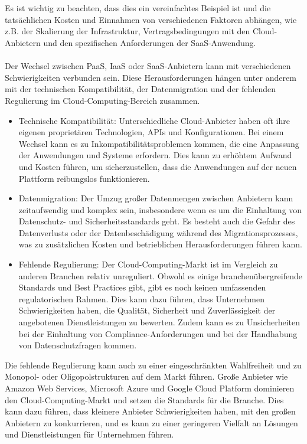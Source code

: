 \documentclass[../vs-script-first-v01.tex]{subfiles}
\begin{document}
\\\\
Es ist wichtig zu beachten, dass dies ein vereinfachtes Beispiel ist und die tatsächlichen Kosten und Einnahmen von verschiedenen Faktoren abhängen, wie z.B. der Skalierung der Infrastruktur, Vertragsbedingungen mit den Cloud-Anbietern und den spezifischen Anforderungen der SaaS-Anwendung.
\\\\
Der Wechsel zwischen PaaS, IaaS oder SaaS-Anbietern kann mit verschiedenen Schwierigkeiten verbunden sein. Diese Herausforderungen hängen unter anderem mit der technischen Kompatibilität, der Datenmigration und der fehlenden Regulierung im Cloud-Computing-Bereich zusammen.
\begin{itemize}
\item Technische Kompatibilität: Unterschiedliche Cloud-Anbieter haben oft ihre eigenen proprietären Technologien, APIs und Konfigurationen. Bei einem Wechsel kann es zu Inkompatibilitätsproblemen kommen, die eine Anpassung der Anwendungen und Systeme erfordern. Dies kann zu erhöhtem Aufwand und Kosten führen, um sicherzustellen, dass die Anwendungen auf der neuen Plattform reibungslos funktionieren.

\item Datenmigration: Der Umzug großer Datenmengen zwischen Anbietern kann zeitaufwendig und komplex sein, insbesondere wenn es um die Einhaltung von Datenschutz- und Sicherheitsstandards geht. Es besteht auch die Gefahr des Datenverlusts oder der Datenbeschädigung während des Migrationsprozesses, was zu zusätzlichen Kosten und betrieblichen Herausforderungen führen kann.

\item Fehlende Regulierung: Der Cloud-Computing-Markt ist im Vergleich zu anderen Branchen relativ unreguliert. Obwohl es einige branchenübergreifende Standards und Best Practices gibt, gibt es noch keinen umfassenden regulatorischen Rahmen. Dies kann dazu führen, dass Unternehmen Schwierigkeiten haben, die Qualität, Sicherheit und Zuverlässigkeit der angebotenen Dienstleistungen zu bewerten. Zudem kann es zu Unsicherheiten bei der Einhaltung von Compliance-Anforderungen und bei der Handhabung von Datenschutzfragen kommen.
\end{itemize}
Die fehlende Regulierung kann auch zu einer eingeschränkten Wahlfreiheit und zu Monopol- oder Oligopolstrukturen auf dem Markt führen. Große Anbieter wie Amazon Web Services, Microsoft Azure und Google Cloud Platform dominieren den Cloud-Computing-Markt und setzen die Standards für die Branche. Dies kann dazu führen, dass kleinere Anbieter Schwierigkeiten haben, mit den großen Anbietern zu konkurrieren, und es kann zu einer geringeren Vielfalt an Lösungen und Dienstleistungen für Unternehmen führen.
\end{document}
